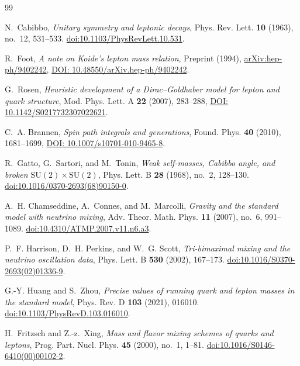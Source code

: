 \documentclass[11pt,reqno]{amsart}
\theoremstyle{definition}
\begin{document}
\begin{thebibliography}{99}
\raggedright

N.~Cabibbo,
\emph{Unitary symmetry and leptonic decays},
Phys. Rev. Lett. \textbf{10} (1963), no.~12, 531--533.
\href{https://doi.org/10.1103/PhysRevLett.10.531}{doi:10.1103/PhysRevLett.10.531}.

R.~Foot,
\emph{A note on Koide's lepton mass relation},
Preprint (1994), \href{https://arxiv.org/abs/hep-ph/9402242}{arXiv:hep-ph/9402242}, \href{https://doi.org/10.48550/arXiv.hep-ph/9402242}{DOI: 10.48550/arXiv.hep-ph/9402242}.

G.~Rosen,
\emph{Heuristic development of a Dirac--Goldhaber model for lepton and quark structure},
Mod. Phys. Lett. A \textbf{22} (2007), 283--288, \href{https://doi.org/10.1142/S0217732307022621}{DOI: 10.1142/S0217732307022621}.

C.~A. Brannen,
\emph{Spin path integrals and generations},
Found. Phys. \textbf{40} (2010), 1681--1699, \href{https://doi.org/10.1007/s10701-010-9465-8}{DOI: 10.1007/s10701-010-9465-8}.

R.~Gatto, G.~Sartori, and M.~Tonin,
\emph{Weak self-masses, Cabibbo angle, and broken $\mathrm{SU}(2) \times \mathrm{SU}(2)$},
Phys. Lett. B \textbf{28} (1968), no.~2, 128--130.
\href{https://doi.org/10.1016/0370-2693(68)90150-0}{doi:10.1016/0370-2693(68)90150-0}.

A.~H. Chamseddine, A.~Connes, and M.~Marcolli,
\emph{Gravity and the standard model with neutrino mixing},
Adv. Theor. Math. Phys. \textbf{11} (2007), no.~6, 991--1089.
\href{https://doi.org/10.4310/ATMP.2007.v11.n6.a3}{doi:10.4310/ATMP.2007.v11.n6.a3}.

P.~F. Harrison, D.~H. Perkins, and W.~G. Scott,
\emph{Tri-bimaximal mixing and the neutrino oscillation data},
Phys. Lett. B \textbf{530} (2002), 167--173.
\href{https://doi.org/10.1016/S0370-2693(02)01336-9}{doi:10.1016/S0370-2693(02)01336-9}.

G.-Y. Huang and S.~Zhou,
\emph{Precise values of running quark and lepton masses in the standard model},
Phys. Rev. D \textbf{103} (2021), 016010.
\href{https://doi.org/10.1103/PhysRevD.103.016010}{doi:10.1103/PhysRevD.103.016010}.

H.~Fritzsch and Z.-z.~Xing,
\emph{Mass and flavor mixing schemes of quarks and leptons},
Prog. Part. Nucl. Phys. \textbf{45} (2000), no.~1, 1--81.
\href{https://doi.org/10.1016/S0146-6410(00)00102-2}{doi:10.1016/S0146-6410(00)00102-2}.


\end{thebibliography}
\end{document}
